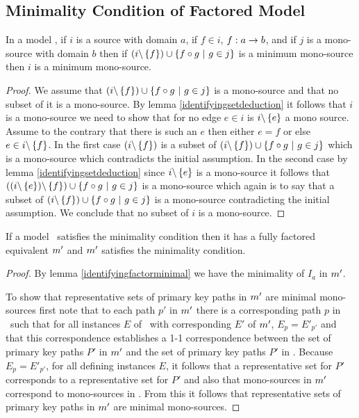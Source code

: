 \subsection{Minimality Condition of Factored Model}

\begin{lemma}
\label{identifyingfactorminimal}
In a model \genericmodel, if $i$ is a source with domain $a$,
if $f \in i$, $f: a \rightarrow b$, 
and if $j$ is a mono-source with domain $b$
then  if $(i \backslash \left\{f\right\}) \cup \left\{f \circ g \ \middle|\ g \in j\right\}$ is a minimum mono-source
then $i$ is a minimum mono-source.
\end{lemma}
\begin{proof}
We assume that $(i \backslash \left\{f\right\}) \cup \left\{f \circ g \ \middle|\ g \in j\right\}$ is a mono-source and that no subset of it is a mono-source.
By lemma \ref{identifyingsetdeduction} it follows that $i$ is a mono-source we need to show that
for no edge $e \in i$ is $i \backslash \left\{e\right\}$ a mono source. Assume to the contrary that there is such an $e$ then  either $e = f$ or else
$e \in i \backslash \left\{f\right\}$. In the first case $(i \backslash \left\{f\right\})$ is a subset of  $(i \backslash \left\{f\right\}) \cup \left\{f \circ g \ \middle|\ g \in j\right\}$ which is a mono-source which contradicts the initial assumption. In the second  case 
by lemma \ref{identifyingsetdeduction} since $i \backslash \left\{e\right\}$ is a mono-source it follows that
$((i \backslash \left\{e\right\})\backslash \left\{f\right\}) \cup \left\{f \circ g \ \middle|\ g \in j\right\}$ is a mono-source which again is to say that a subset
of $(i \backslash \left\{f\right\}) \cup \left\{f \circ g \ \middle|\ g \in j\right\}$ is a mono-source contradicting the initial assumption.
We conclude that no subset of $i$ is a mono-source.
\end{proof}

\begin{lemma}
If a model \genericmodel\ satisfies the minimality condition then it has a fully factored
equivalent ${m}'$  and ${m}'$ satisfies the minimality condition. 
\end{lemma}
\begin{proof}
By lemma \ref{identifyingfactorminimal} we have the minimality of $I_a$ in ${m}'$.

To show that representative sets of primary key paths in ${m}'$ are minimal mono-sources
first note that to each path $p'$ in ${m}'$ there is a corresponding path 
$p$ in \genericmodel\  
 such that for all instances $E$ of \genericmodel\ with corresponding $E'$ of ${m}'$, 
$E_p=E'_{p'}$ and that this correspondence establishes a 1-1 correspondence between the set of primary key paths $P'$ in ${m}'$
and the set of primary key paths $P'$ in \genericmodel. Because $E_p=E'_{p'}$, for all defining instances
$E$, it follows that a representative set for $P'$ corresponds to a representative set for $P'$ and also
that mono-sources in ${m}'$ correspond to mono-sources in \genericmodel. From this it follows that representative sets of primary key paths in ${m}'$ are minimal mono-sources.
\end{proof}
